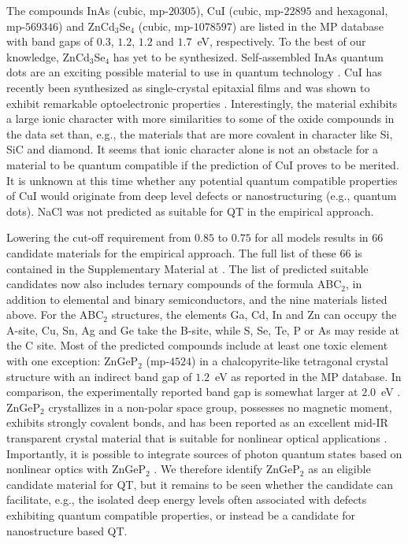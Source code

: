 \documentclass[superscriptaddress,unsortedaddress,
 amsmath,amssymb,
 aps,
]{revtex4-2}
\begin{document}
The compounds InAs (cubic, mp-$20305$), CuI (cubic, mp-$22895$ and hexagonal, mp-$569346$) and ZnCd$_3$Se$_4$ (cubic, mp-$1078597$) are listed in the MP database with band gaps of $0.3$, $1.2$, $1.2$ and $1.7$~eV, respectively. 
To the best of our knowledge, ZnCd$_3$Se$_4$ has yet to be synthesized. 
Self-assembled InAs quantum dots are an exciting possible material to use in quantum technology \cite{Liu2018}. 
CuI has recently been synthesized as single-crystal epitaxial films and was shown to exhibit remarkable optoelectronic properties \cite{Ahn2020}. Interestingly, the material exhibits a large ionic character with more similarities to some of the oxide compounds in the data set than, e.g., the materials that are more covalent in character like Si, SiC and  diamond.  
It seems that ionic character alone is not an obstacle for a material to be quantum compatible if the prediction of CuI proves to be merited. It is unknown at this time whether any potential quantum compatible properties of CuI would originate from deep level defects or nanostructuring (e.g., quantum dots). NaCl was not predicted as suitable for QT in the empirical approach.  

Lowering the cut-off requirement from $0.85$ to $0.75$ for all models results in $66$ candidate materials for the empirical approach.  
The full list of these $66$ is contained in the Supplementary Material at \cite{supplementary}. 
The list of predicted suitable candidates now also includes ternary compounds of the formula ABC$_2$, in addition to elemental and binary semiconductors, and the nine materials listed above. For the ABC$_2$ structures, the elements Ga, Cd, In and Zn can occupy the A-site, Cu, Sn, Ag and Ge take the B-site, while S, Se, Te, P or As may reside at the C site. Most of the predicted compounds include at least one toxic element with one exception: ZnGeP$_2$ (mp-$4524$) in a chalcopyrite-like tetragonal crystal structure with an indirect band gap of $1.2$~eV \cite{Zhang2015} as reported in the MP database. In comparison, the experimentally reported band gap is somewhat larger at $2.0$~eV \cite{Xing1989}. 
ZnGeP$_2$ crystallizes in a non-polar space group, possesses no magnetic moment, exhibits strongly covalent bonds, and has been reported as an excellent mid-IR transparent crystal material that is suitable for nonlinear optical applications \cite{Zhang2015}. Importantly, it is possible to integrate sources of photon quantum states based on nonlinear optics with ZnGeP$_2$ \cite{Caspani2017}. 
We therefore identify ZnGeP$_2$ as an eligible candidate material for QT, but it remains to be seen whether the candidate can facilitate, e.g., the isolated deep energy levels often associated with defects exhibiting quantum compatible properties, or instead be a candidate for nanostructure based QT.  
\end{document}
